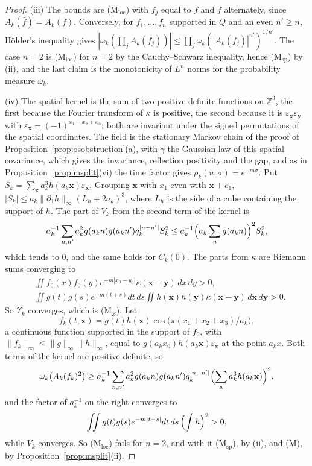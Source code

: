 \documentclass[aps,prd,twocolumn,superscriptaddress,nofootinbib,longbibliography,floatfix,amsmath,amssymb,10pt]{revtex4-2}
\theoremstyle{definition}
\theoremstyle{remark}
\newcommand{\Z}{\mathbb{Z}}
\begin{document}
\begin{proof}
(iii) The bounds are (M$_{\mathrm{loc}}$) with $f_j$ equal to $\bar f$ and
$f$ alternately, since $A_k(\bar f)=\overline{A_k(f)}$. Conversely, for
$f_1,\dots,f_n$ supported in $Q$ and an even $n'\ge n$, H\"older's
inequality gives $|\omega_k(\prod_jA_k(f_j))|\le\prod_j\omega_k(|A_k(f_j)|
^{n'})^{1/n'}$. The case $n=2$ is (M$_{\mathrm{loc}}$) for $n=2$ by the
Cauchy--Schwarz inequality, hence (M$_{\mathrm{sp}}$) by (ii), and the last
claim is the monotonicity of $L^n$ norms for the probability measure
$\omega_k$.

(iv) The spatial kernel is the sum of two positive definite functions on
$\Z^3$, the first because the Fourier transform of $\kappa$ is positive, the
second because it is $\varepsilon_{\mathbf x}\varepsilon_{\mathbf y}$ with
$\varepsilon_{\mathbf x}=(-1)^{x_1+x_2+x_3}$; both are invariant under the
signed permutations of the spatial coordinates. The field is the stationary
Markov chain of the proof of Proposition~\ref{prop:osobstruction}(a), with
$\gamma$ the Gaussian law of this spatial covariance, which gives the
invariance, reflection positivity and the gap, and as in
Proposition~\ref{prop:msplit}(vi) the time factor gives
$\rho_k(u,\sigma)=e^{-m\sigma}$. Put $S_k=\sum_{\mathbf x}a_k^3h(a_k
\mathbf x)\varepsilon_{\mathbf x}$. Grouping $\mathbf x$ with $x_1$ even with
$\mathbf x+e_1$, $|S_k|\le a_k\|\partial_1h\|_\infty(L_h+2a_k)^3$, where
$L_h$ is the side of a cube containing the support of $h$. The part of $V_k$
from the second term of the kernel is
\[
a_k^{-1}\sum_{n,n'}a_k^2g(a_kn)g(a_kn')q_k^{|n-n'|}S_k^2\le a_k^{-1}
\Bigl(a_k\sum_ng(a_kn)\Bigr)^2S_k^2 ,
\]
which tends to $0$, and the same holds for $C_k(0)$. The parts from $\kappa$
are Riemann sums converging to
\[
\begin{split}
&\iint f_0(x)f_0(y)e^{-m|x_0-y_0|}\kappa(\mathbf x-\mathbf y)\,dx\,dy>0,\\
&\iint g(t)g(s)e^{-m(t+s)}dt\,ds\iint h(\mathbf x)h(\mathbf y)
\kappa(\mathbf x-\mathbf y)\,d\mathbf x\,d\mathbf y>0 .
\end{split}
\]
So $\Upsilon_k$ converges, which is (M$_Z$). Let
\[
f_k(t,\mathbf x)=g(t)h(\mathbf x)\cos\bigl(\pi(x_1+x_2+x_3)/a_k\bigr),
\]
a continuous function supported in the support of $f_0$, with
$\|f_k\|_\infty\le\|g\|_\infty\|h\|_\infty$, equal to $g(a_kx_0)h(a_k
\mathbf x)\varepsilon_{\mathbf x}$ at the point $a_kx$. Both terms of the kernel are positive definite, so
\[
\omega_k\bigl(A_k(f_k)^2\bigr)\ge a_k^{-1}\sum_{n,n'}a_k^2g(a_kn)g(a_kn')
q_k^{|n-n'|}\Bigl(\sum_{\mathbf x}a_k^3h(a_k\mathbf x)\Bigr)^2 ,
\]
and the factor of $a_k^{-1}$ on the right converges to
\[
\iint g(t)g(s)e^{-m|t-s|}dt\,ds\,\Bigl(\int h\Bigr)^2>0 ,
\]
while $V_k$ converges. So (M$_{\mathrm{loc}}$) fails for $n=2$, and
with it (M$_{\mathrm{sp}}$), by (ii), and (M), by
Proposition~\ref{prop:msplit}(ii).


\end{proof}
\end{document}
